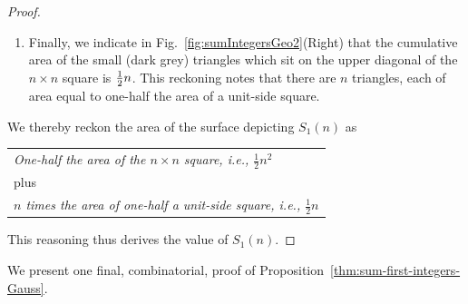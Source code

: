 \begin{proof}
\begin{enumerate}
\medskip\item
Finally, we indicate in Fig.~\ref{fig:sumIntegersGeo2}(Right) that the cumulative area of the small (dark grey) triangles which sit on the upper diagonal of the $n \times n$ square is ${1 \over 2} n$.  This reckoning notes that there are $n$ triangles, each of area equal to one-half the area of a unit-side square.
\end{enumerate}
We thereby reckon the area of the surface depicting $S_1(n)$ as

\begin{tabular}{l}
{\it One-half the area of the $n \times n$ square,
i.e., $\frac{1}{2} n^2$} \\
\hspace*{.15in} plus   \\
{\it $n$ times the area of one-half a unit-side square,
i.e., $\frac{1}{2} n$}
\end{tabular}

\smallskip

\noindent
This reasoning thus derives the value of $S_1(n)$.
\end{proof}

\medskip

We present one final, combinatorial, proof of Proposition~\ref{thm:sum-first-integers-Gauss}.

